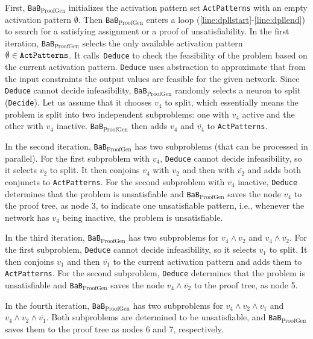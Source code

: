 \documentclass[oneside,11pt,dvipsnames]{book}
\numberwithin{equation}{section}
\theoremstyle{definition}
\theoremstyle{remark}
\newcommand{\functiontextformat}[1]{\textrm{\texttt{#1}}}
\newcommand{\proofgen}{\texttt{BaB$_{\text{ProofGen}}$}}
\begin{document}
First, \proofgen{} initializes the activation pattern set \functiontextformat{ActPatterns} with an empty activation pattern $\emptyset$. Then \proofgen{} enters a loop (\autoref{line:dpllstart}-\autoref{line:dpllend}) to search for a satisfying assignment or a proof of unsatisfiability. In the first iteration, \proofgen{} selects the only available activation pattern $\emptyset \in \functiontextformat{ActPatterns}$. 
It calls~\functiontextformat{Deduce} to check the feasibility of the problem based on the current activation pattern. \functiontextformat{Deduce} uses abstraction to approximate that from the input constraints the output values are feasible for the given network. 
Since \functiontextformat{Deduce} cannot decide infeasibility, \proofgen{} randomly selects a neuron to split (\functiontextformat{Decide}). Let us assume that it chooses $v_4$ to split, which essentially means the problem is split into two independent subproblems: one with $v_4$ active and the other with $v_4$ inactive.
\proofgen{} then adds $v_4$ and $\overline{v_4}$ to \functiontextformat{ActPatterns}.

In the second iteration, \proofgen{} has two subproblems (that can be processed in parallel). For the first subproblem with $v_4$, \functiontextformat{Deduce} cannot decide infeasibility, so it selects $v_2$ to split. It then conjoins $v_4$ with $v_2$ and then with $\overline{v_2}$ and adds both conjuncts to \texttt{ActPatterns}. 
For the second subproblem with $\overline{v_4}$ inactive, \functiontextformat{Deduce} determines that the problem is unsatisfiable and \proofgen{} saves the node $v_4$ to the proof tree, as node 3, to indicate one unsatisfiable pattern, i.e., whenever the network has $v_4$ being inactive, the problem is unsatisfiable.

In the third iteration, \proofgen{} has two subproblems for $v_4 \land v_2$ and $v_4 \land \overline{v_2}$. For the first subproblem, \functiontextformat{Deduce} cannot decide infeasibility, so it selects $v_1$ to split. It then conjoins $v_1$ and then $\overline{v_1}$ to the current activation pattern and adds them to \functiontextformat{ActPatterns}. For the second subproblem, \functiontextformat{Deduce} determines that the problem is unsatisfiable and \proofgen{} saves the node $v_4 \land \overline{v_2}$ to the proof tree, as node 5.

In the fourth iteration, \proofgen{} has two subproblems for $v_4 \land v_2 \land v_1$ and $v_4 \land v_2 \land \overline{v_1}$. Both subproblems are determined to be unsatisfiable, and \proofgen{} saves them to the proof tree as nodes 6 and 7, respectively.
\end{document}
